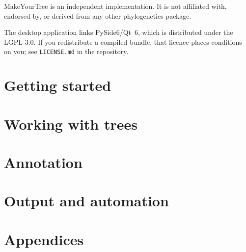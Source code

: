 \documentclass[11pt,a4paper,openany]{book}
\newcommand{\app}{MakeYourTree}
\newcommand{\cmd}[1]{\texttt{#1}}
\begin{document}
\vspace{4mm}
\noindent \app{} is an independent implementation. It is not affiliated with,
endorsed by, or derived from any other phylogenetics package.

\vspace{4mm}
\noindent The desktop application links PySide6/Qt~6, which is distributed under
the LGPL-3.0. If you redistribute a compiled bundle, that licence places
conditions on you; see \cmd{LICENSE.md} in the repository.

\vfill
{}

\cleardoublepage

\setcounter{tocdepth}{1}
\tableofcontents
\cleardoublepage
{}

\part{Getting started}




\part{Working with trees}





\part{Annotation}



\part{Output and automation}




\appendix
\part{Appendices}


\end{document}
